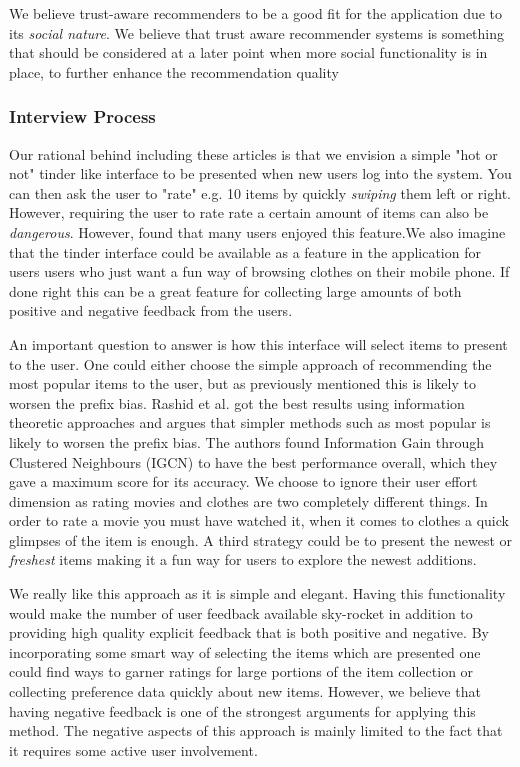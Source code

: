 We believe trust-aware recommenders to be a good fit for the application
due to its \emph{social nature}. We believe that trust aware recommender systems
is something that should be considered at a later point when more social functionality
is in place, to further enhance the recommendation quality

\subsubsection{Interview Process}

Our rational behind including these articles is that we envision a simple "hot
or not" tinder like interface to be presented when new users log into the system.
You can then ask the user to "rate" e.g. 10 items by quickly \emph{swiping} them
left or right. However, requiring the user to rate rate a certain amount of items
can also be \emph{dangerous}. However, \cite{SuitUp} found that many users
enjoyed this feature.We also imagine that the tinder interface
could be available as a feature in the application for users users who just want a
fun way of browsing clothes on their mobile phone. If done right this can be
a great feature for collecting large amounts of both positive and negative feedback
from the users.

An important question to answer is how this interface will select items to
present to the user. One could either choose the simple approach of
recommending the most popular items to the user, but as previously mentioned
this is likely to worsen the prefix bias. Rashid et al. \cite{Rashid2008} got
the best results using information theoretic approaches and argues that simpler
methods such as most popular is likely to worsen the prefix bias. The authors
found Information Gain through Clustered Neighbours (IGCN) to have the best
performance overall, which they gave a maximum score for its accuracy. We choose
to ignore their user effort dimension as rating movies and clothes are two
completely different things. In order to rate a movie you must have watched
it, when it comes to clothes a quick glimpses of the item is enough.
A third strategy could be to present the newest or \emph{freshest} items
making it a fun way for users to explore the newest additions.

We really like this approach as it is simple and elegant. Having this
functionality would make the number of user feedback available sky-rocket in addition
to providing high quality explicit feedback that is both positive and negative.
By incorporating some smart way of selecting the items which are presented
one could find ways to garner ratings for large portions of the item collection
or collecting preference data quickly about new items. However, we believe
that having negative feedback is one of the strongest arguments for applying
this method. The negative aspects of this approach is mainly limited to the fact
that it requires some active user involvement.

